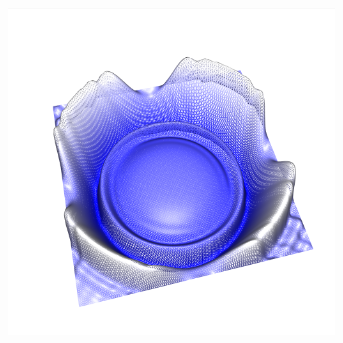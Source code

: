 \documentclass[crop=false,10pt,ngerman]{standalone}
\begin{document}
\begin{figure}[p]
\begin{subfigure}[b]{0.24\textwidth}
          \caption{}
        \end{subfigure}
        \begin{subfigure}[b]{0.24\textwidth}
          \center
          \includegraphics[trim={2cm 1.5cm 1.2cm 1.0cm},clip,width=0.95\textwidth]{images/quad_wave_3.png}
          \caption{}
        \end{subfigure}


\end{figure}
\end{document}
